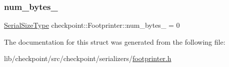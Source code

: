\subsubsection{\texorpdfstring{num\+\_\+bytes\+\_\+}{num\_bytes\_}}
{\footnotesize\ttfamily \hyperlink{namespacecheckpoint_a083f6674da3f94c2901b18c6d238217c}{Serial\+Size\+Type} checkpoint\+::\+Footprinter\+::num\+\_\+bytes\+\_\+ = 0\hspace{0.3cm}{\ttfamily [private]}}



The documentation for this struct was generated from the following file\+:\begin{DoxyCompactItemize}
\item 
lib/checkpoint/src/checkpoint/serializers/\hyperlink{footprinter_8h}{footprinter.\+h}\end{DoxyCompactItemize}
